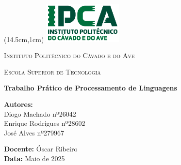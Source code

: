 \documentclass[12pt]{article}
\begin{document}
	\begin{titlepage}
		\begin{textblock*}{3cm}(14.5cm,1cm) %
			\includegraphics[width=4cm]{images/IPCA-Logo_v2.png}
		\end{textblock*}
		
		\centering
		\vspace*{1cm}
		{\scshape\Large Instituto Politécnico do Cávado e do Ave \par}
		{\scshape\large Escola Superior de Tecnologia\par}
		\vspace{2cm}
		
		{\huge\bfseries Trabalho Prático de Processamento de Linguagens \par}
		\vspace{2cm}
		
		\begin{flushleft}
			\textbf{Autores:} \\
			Diogo Machado nº26042 \\
			Enrique Rodrigues nº28602 \\
			José Alves nº279967
		\end{flushleft}
		
		\vfill
		
		\begin{flushright}
			\textbf{Docente:} Óscar Ribeiro\\
			\textbf{Data:} Maio de 2025
		\end{flushright}
	\end{titlepage}
	
\begin{abstract}
Este artigo descreve o desenvolvimento de um interpretador para a linguagem CQL (Cassandra Query Language), 
implementado em Python. O interpretador é capaz de processar comandos CQL, realizar análise léxica e sintática, 
e executar operações básicas de manipulação de dados. O projeto demonstra a aplicação prática de conceitos 
de compiladores e processamento de linguagens, incluindo análise léxica, análise sintática, e geração de 
árvores de sintaxe abstrata (AST). São apresentados exemplos práticos de código e visualizações da AST 
para demonstrar o funcionamento do interpretador.
\end{abstract}
\end{document}
